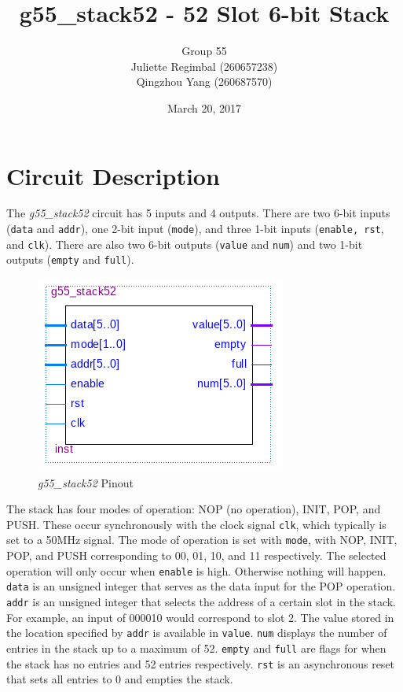 \documentclass[12pt]{article}
\title{g55\_stack52 - 52 Slot 6-bit Stack}
\author{Group 55\\Juliette Regimbal (260657238)\\Qingzhou Yang (260687570)}
\date{March 20, 2017}
\begin{document}
\maketitle
\setlength{\parindent}{0ex}
\section{Circuit Description}
The \textit{g55\_stack52} circuit has 5 inputs and 4 outputs. There are two 6-bit inputs (\texttt{data} and \texttt{addr}), one 2-bit input (\texttt{mode}), and three 1-bit inputs (\texttt{enable, rst}, and \texttt{clk}). There are also two 6-bit outputs (\texttt{value} and \texttt{num}) and two 1-bit outputs (\texttt{empty} and \texttt{full}). 

\begin{figure}[h!t]
\centering
\includegraphics[scale=0.5]{graphics/stack_pinout.png}
\caption{\textit{g55\_stack52} Pinout}
\end{figure}

The stack has four modes of operation: NOP (no operation), INIT, POP, and PUSH. These occur synchronously with the clock signal \texttt{clk}, which typically is set to a 50MHz signal. The mode of operation is set with \texttt{mode}, with NOP, INIT, POP, and PUSH corresponding to 00, 01, 10, and 11 respectively. The selected operation will only occur when \texttt{enable} is high. Otherwise nothing will happen. \texttt{data} is an unsigned integer that serves as the data input for the POP operation. \texttt{addr} is an unsigned integer that selects the address of a certain slot in the stack. For example, an input of 000010 would correspond to slot 2. The value stored in the location specified by \texttt{addr} is available in \texttt{value}. \texttt{num} displays the number of entries in the stack up to a maximum of 52. \texttt{empty} and \texttt{full} are flags for when the stack has no entries and 52 entries respectively. \texttt{rst} is an asynchronous reset that sets all entries to 0 and empties the stack.\\
\end{document}
